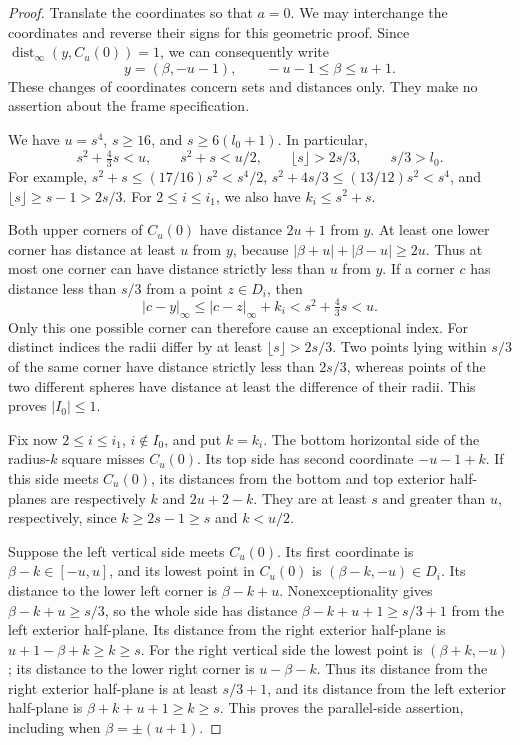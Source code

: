 \begin{proof}
Translate the coordinates so that \(a=0\).  We may interchange the
coordinates and reverse their signs for this geometric proof.  Since
\(\operatorname{dist}_\infty(y,C_u(0))=1\), we can consequently write
\[
 y=(\beta,-u-1),\qquad -u-1\le\beta\le u+1.
\]
These changes of coordinates concern sets and distances only.
They make no assertion about the frame specification.

We have \(u=s^4\), \(s\ge16\), and \(s\ge6(l_0+1)\).  In particular,
\[
 s^2+\tfrac43s<u,\qquad s^2+s<u/2,\qquad
 \lfloor s\rfloor>2s/3,\qquad s/3>l_0.
\]
For example, \(s^2+s\le(17/16)s^2<s^4/2\),
\(s^2+4s/3\le(13/12)s^2<s^4\), and
\(\lfloor s\rfloor\ge s-1>2s/3\).
For \(2\le i\le i_1\), we also have \(k_i\le s^2+s\).

Both upper corners of \(C_u(0)\) have distance \(2u+1\) from
\(y\).  At least one lower corner has distance at least \(u\)
from \(y\), because
\( |\beta+u|+|\beta-u|\ge2u\).
Thus at most one corner can have distance strictly less than \(u\)
from \(y\).  If a corner \(c\) has distance less than \(s/3\)
from a point \(z\in D_i\), then
\[
 |c-y|_\infty\le |c-z|_\infty+k_i
       <s^2+\tfrac43s<u.
\]
Only this one possible corner can therefore cause an exceptional
index.  For distinct indices the radii differ by at least
\(\lfloor s\rfloor>2s/3\).  Two points lying within \(s/3\)
of the same corner have distance strictly less than \(2s/3\),
whereas points of the two different spheres have distance at least
the difference of their radii.  This proves \(|I_0|\le1\).

Fix now \(2\le i\le i_1\), \(i\notin I_0\), and put \(k=k_i\).
The bottom horizontal side of the radius-\(k\) square misses
\(C_u(0)\).  Its top side has second coordinate \(-u-1+k\).
If this side meets \(C_u(0)\), its distances from the bottom and
top exterior half-planes are respectively \(k\) and \(2u+2-k\).
They are at least \(s\) and greater than \(u\), respectively,
since \(k\ge2s-1\ge s\) and \(k<u/2\).

Suppose the left vertical side meets \(C_u(0)\).  Its first
coordinate is \(\beta-k\in[-u,u]\), and its lowest point in
\(C_u(0)\) is \((\beta-k,-u)\in D_i\).  Its distance to the
lower left corner is \(\beta-k+u\).  Nonexceptionality gives
\(\beta-k+u\ge s/3\), so the whole side has distance
\(\beta-k+u+1\ge s/3+1\) from the left exterior half-plane.
Its distance from the right exterior half-plane is
\(u+1-\beta+k\ge k\ge s\).
For the right vertical side the lowest point is
\((\beta+k,-u)\); its distance to the lower right corner is
\(u-\beta-k\).  Thus its distance from the right exterior
half-plane is at least \(s/3+1\), and its distance from the
left exterior half-plane is \(\beta+k+u+1\ge k\ge s\).
This proves the parallel-side assertion, including when
\(\beta=\pm(u+1)\).


\end{proof}
